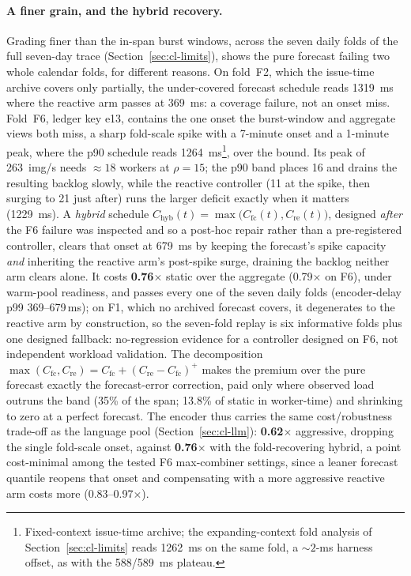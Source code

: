 \paragraph{A finer grain, and the hybrid recovery.} Grading finer than the
in-span burst windows, across the seven daily folds of the full seven-day
trace (Section~\ref{sec:cl-limits}), shows the pure forecast failing two
whole calendar folds, for different reasons. On fold~F2, which the issue-time
archive covers only partially, the under-covered forecast schedule reads
\SI{1319}{\milli\second} where the reactive arm passes at
\SI{369}{\milli\second}: a coverage failure, not an onset miss. Fold~F6,
ledger key e13, contains the one onset the burst-window and aggregate views
both miss, a sharp
fold-scale spike with a 7-minute onset and a 1-minute peak,
where the p90 schedule reads \SI{1264}{\milli\second}\footnote{Fixed-context
issue-time archive; the expanding-context fold analysis of
Section~\ref{sec:cl-limits} reads \SI{1262}{\milli\second} on the same fold, a
${\sim}2$-ms harness offset, as with the \SI{588}{}/\SI{589}{\milli\second}
plateau.}, over the bound. Its peak of \SI{263}{img/s} needs ${\approx}18$
workers at $\rho{=}15$; the p90 band places 16 and drains the resulting backlog
slowly, while the reactive controller (11 at the spike, then surging to 21
just after) runs the larger deficit exactly when it matters
(\SI{1229}{\milli\second}). A \emph{hybrid} schedule
$C_{\text{hyb}}(t)=\max\!\bigl(C_{\text{fc}}(t), C_{\text{re}}(t)\bigr)$,
designed \emph{after} the F6 failure was inspected and so a post-hoc repair
rather than a pre-registered controller, clears that onset at
\SI{679}{\milli\second} by
keeping the forecast's spike capacity \emph{and} inheriting the reactive arm's
post-spike surge, draining the backlog neither arm clears alone. It costs
\textbf{0.76$\times$} static over the aggregate (0.79$\times$ on F6), under
warm-pool readiness, and passes every one of the seven daily folds
(encoder-delay p99 369--679\,\si{\milli\second}); on F1, which no archived
forecast covers, it degenerates to the reactive arm by construction, so the
seven-fold replay is six informative folds plus one designed fallback:
no-regression evidence for a controller designed on F6, not independent
workload validation. The decomposition $\max(C_{\text{fc}},C_{\text{re}})=C_{\text{fc}}+(C_{\text{re}}-C_{\text{fc}})^{+}$ makes the
premium over the pure forecast exactly the forecast-error correction, paid
only where observed load outruns the band (35\% of the span; 13.8\% of static
in worker-time) and shrinking to zero at a perfect forecast. The encoder thus
carries the same cost/robustness trade-off as the language pool
(Section~\ref{sec:cl-llm}): \textbf{0.62$\times$} aggressive, dropping the
single fold-scale onset, against \textbf{0.76$\times$} with the fold-recovering
hybrid, a point cost-minimal among the tested F6 max-combiner settings, since a
leaner forecast quantile reopens that onset and compensating with a more
aggressive reactive arm costs more (0.83--0.97$\times$).

